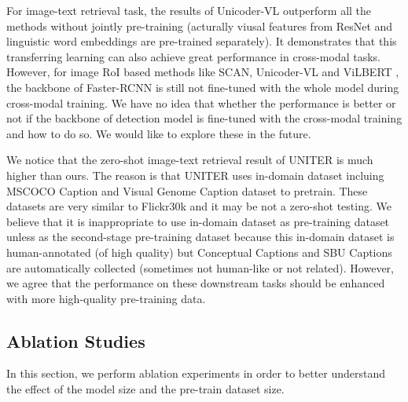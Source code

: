 \documentclass[letterpaper]{article} \usepackage{aaai20}  \usepackage{times}  \usepackage{helvet} \usepackage{courier}  \usepackage[hyphens]{url}  \usepackage{graphicx} \urlstyle{rm} \def\UrlFont{\rm}  \usepackage{graphicx}  \frenchspacing  \setlength{\pdfpagewidth}{8.5in}  \setlength{\pdfpageheight}{11in}  \usepackage{amssymb}
\begin{document}
For image-text retrieval task, the results of Unicoder-VL outperform all the methods without jointly pre-training (acturally viusal features from ResNet and linguistic word embeddings are pre-trained separately). It demonstrates that this transferring learning can also achieve great performance in cross-modal tasks. However, for image RoI based methods like SCAN\cite{lee2018stacked}, Unicoder-VL and ViLBERT \cite{lu2019vilbert}, the backbone of Faster-RCNN is still not fine-tuned with the whole model during cross-modal training. We have no idea that whether the performance is better or not if the backbone of detection model is fine-tuned with the cross-modal training and how to do so. We would like to explore these in the future.

We notice that the zero-shot image-text retrieval result of UNITER\cite{chen2019uniter} is much higher than ours. The reason is that UNITER uses in-domain dataset incluing MSCOCO Caption and Visual Genome Caption dataset to pretrain. These datasets are very similar to Flickr30k and it may be not a zero-shot testing. We believe that it is inappropriate to use in-domain dataset as pre-training dataset unless as the second-stage pre-training dataset because this in-domain dataset is human-annotated (of high quality) but Conceptual Captions and SBU Captions are automatically collected (sometimes not human-like or not related). However, we agree that the performance on these downstream tasks should be enhanced with more high-quality pre-training data. 

\subsection{Ablation Studies}
In this section, we perform ablation experiments in order to better understand the effect of the model size and the pre-train dataset size. 
\end{document}
